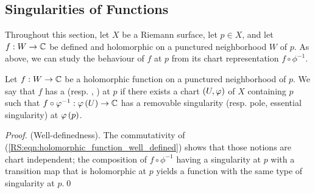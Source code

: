 \documentclass[../Moduli_Spaces_of_Riemann_Surfaces.tex]{subfiles}
\begin{document}
    \subsection{Singularities of Functions}
    Throughout this section, let $X$ be a Riemann surface, let $p\in X$, and let $f:W\to\mathbb{C}$ be defined and holomorphic on a punctured neighborhood $W$ of $p$. As above, we can study the behaviour of $f$ at $p$ from its chart representation $f\circ\phi^{-1}$.
    \begin{definition}
        Let $f:W\to\mathbb{C}$ be a holomorphic function on a punctured neighborhood of $p$. We say that $f$ has a  (resp. , ) at $p$ if there exists a chart $\left(U,\varphi\right)$ of $X$ containing $p$ such that $f\circ\varphi^{-1}:\varphi\left(U\right)\to\mathbb{C}$ has a removable singularity (resp. pole, essential singularity) at $\varphi\left(p\right)$.
    \end{definition}
    \begin{proof}
        (Well-definedness). The commutativity of (\ref{RS:eqn:holomorphic_function_well_defined}) shows that those notions are chart independent; the composition of $f\circ\phi^{-1}$ having a singularity at $p$ with a transition map that is holomorphic at $p$ yields a function with the same type of singularity at $p$.\qed
    \end{proof}
\end{document}
